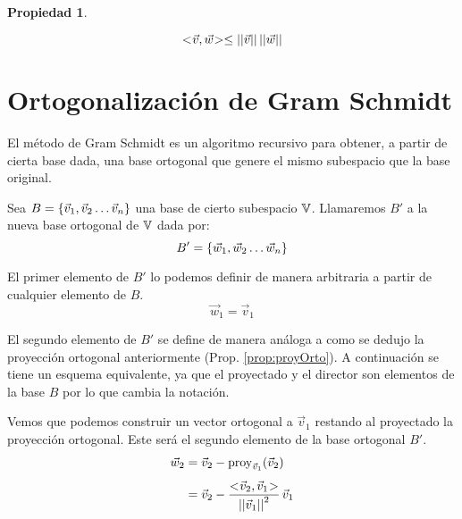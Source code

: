 \documentclass[a5paper,12pt,twoside]{book}
\newtheorem{prop}{{Propiedad}}[chapter]
\begin{document}
\begin{mdframed}[style=MyFrame1]
    \begin{prop}
    \end{prop}
    \begin{equation*}
        <\hspace{-0.8mm}\Vec{v},\Vec{w}\hspace{-0.8mm}> \leq {\left|\left| {\Vec{v}} \right|\right|} \, {\left|\left| {\Vec{w}} \right|\right|}
    \end{equation*}
\end{mdframed}


\section{Ortogonalización de Gram Schmidt}

El método de Gram Schmidt es un algoritmo recursivo para obtener, a partir de cierta base dada, una base ortogonal que genere el mismo subespacio que la base original.

Sea $B={ \left\{ {\Vec{v}_1 , \Vec{v}_2 \dots \Vec{v}_n} \right\} }$ una base de cierto subespacio $\mathbb{V}$. Llamaremos $B'$ a la nueva base ortogonal de $\mathbb{V}$ dada por:
\begin{equation*}
    B' = { \left\{ {\Vec{w}_1 , \Vec{w}_2 \dots \Vec{w}_n} \right\} }
\end{equation*}

El primer elemento de $B'$ lo podemos definir de manera arbitraria a partir de cualquier elemento de $B$.
\begin{equation*}
    \Vec{w}_1 = \Vec{v}_1
\end{equation*}

El segundo elemento de $B'$ se define de manera análoga a como se dedujo la proyección ortogonal anteriormente (Prop. \ref{prop:proyOrto}). A continuación se tiene un esquema equivalente, ya que el proyectado y el director son elementos de la base $B$ por lo que cambia la notación.

\begin{center}
\end{center}

Vemos que podemos construir un vector ortogonal a $\Vec{v}_1$ restando al proyectado la proyección ortogonal. Este será el segundo elemento de la base ortogonal $B'$.
\begin{align*}
    \Vec{w}_2 &= \Vec{v}_2 - \operatorname{proy}_{\Vec{v}_1}(\Vec{v}_2)
    \\[1ex]
    &= \Vec{v}_2 - \frac{<\hspace{-0.8mm}\Vec{v}_2,\Vec{v}_1\hspace{-0.8mm}>}{{\left|\left| {\Vec{v}_1} \right|\right|}^2} \, \Vec{v}_1
\end{align*}
\end{document}
